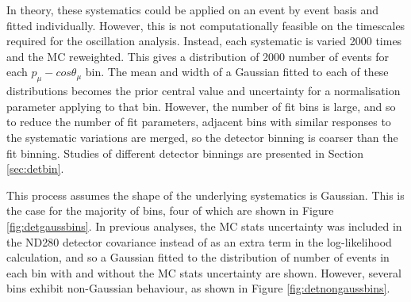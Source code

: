 In theory, these systematics could be applied on an event by event basis and fitted individually. However, this is not computationally feasible on the timescales required for the oscillation analysis. Instead, each systematic is varied 2000 times and the MC reweighted. This gives a distribution of 2000 number of events for each $p_{\mu}-cos\theta_{\mu}$ bin. The mean and width of a Gaussian fitted to each of these distributions becomes the prior central value and uncertainty for a normalisation parameter applying to that bin. However, the number of fit bins is large, and so to reduce the number of fit parameters, adjacent bins with similar responses to the systematic variations are merged, so the detector binning is coarser than the fit binning. Studies of different detector binnings are presented in Section \ref{sec:detbin}.

This process assumes the shape of the underlying systematics is Gaussian. This is the case for the majority of bins, four of which are shown in Figure \ref{fig:detgaussbins}. In previous analyses, the MC stats uncertainty was included in the ND280 detector covariance instead of as an extra term in the log-likelihood calculation, and so a Gaussian fitted to the distribution of number of events in each bin with and without the MC stats uncertainty are shown. However, several bins exhibit non-Gaussian behaviour, as shown in Figure \ref{fig:detnongaussbins}.

